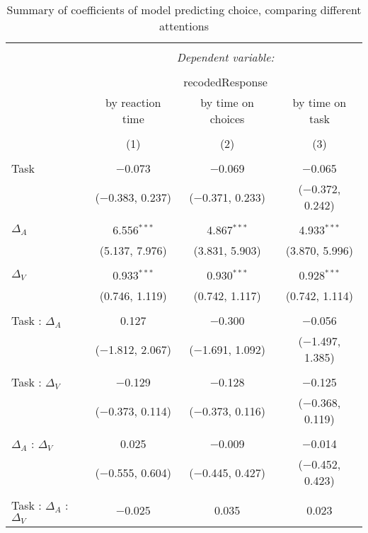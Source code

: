 
\begin{table}[h] \centering 
  \caption{Summary of coefficients of model predicting choice, comparing different attentions} 
  \label{table:choiceModelAttention} 
\begin{tabular}{@{\extracolsep{5pt}}lccc} 
\\[-1.8ex]\hline 
\hline \\[-1.8ex] 
 & \multicolumn{3}{c}{\textit{Dependent variable:}} \\ 
\cline{2-4} 
\\[-1.8ex] & \multicolumn{3}{c}{recodedResponse} \\ 
 & by reaction time & by time on choices & by time on task \\ 
\\[-1.8ex] & (1) & (2) & (3)\\ 
\hline \\[-1.8ex] 
 Task & $-$0.073 & $-$0.069 & $-$0.065 \\ 
  & ($-$0.383, 0.237) & ($-$0.371, 0.233) & ($-$0.372, 0.242) \\ 
  & & & \\ 
 $\Delta_A$ & 6.556$^{***}$ & 4.867$^{***}$ & 4.933$^{***}$ \\ 
  & (5.137, 7.976) & (3.831, 5.903) & (3.870, 5.996) \\ 
  & & & \\ 
 $\Delta_V$ & 0.933$^{***}$ & 0.930$^{***}$ & 0.928$^{***}$ \\ 
  & (0.746, 1.119) & (0.742, 1.117) & (0.742, 1.114) \\ 
  & & & \\ 
 Task : $\Delta_A$ & 0.127 & $-$0.300 & $-$0.056 \\ 
  & ($-$1.812, 2.067) & ($-$1.691, 1.092) & ($-$1.497, 1.385) \\ 
  & & & \\ 
 Task : $\Delta_V$ & $-$0.129 & $-$0.128 & $-$0.125 \\ 
  & ($-$0.373, 0.114) & ($-$0.373, 0.116) & ($-$0.368, 0.119) \\ 
  & & & \\ 
 $\Delta_A$ : $\Delta_V$ & 0.025 & $-$0.009 & $-$0.014 \\ 
  & ($-$0.555, 0.604) & ($-$0.445, 0.427) & ($-$0.452, 0.423) \\ 
  & & & \\ 
 Task : $\Delta_A$ :  $\Delta_V$ & $-$0.025 & 0.035 & 0.023 \\ 

\end{tabular}
\end{table}
